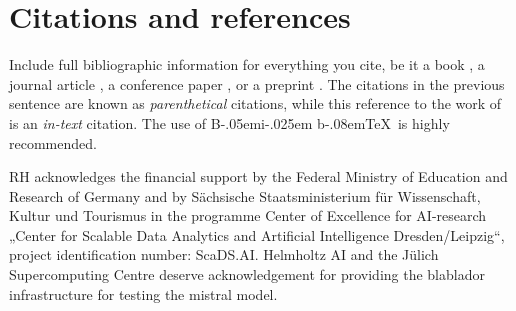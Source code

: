 \documentclass[doubleblind]{ecai}
\newcommand{\BibTeX}{B\kern-.05em{\sc i\kern-.025em b}\kern-.08em\TeX}
\begin{document}


\section{Citations and references}

Include full bibliographic information for everything you cite, 
be it a book \citep{pearl2009causality}, a journal article 
\citep{grosz1996collaborative,rumelhart1986learning,turing1950computing}, 
a conference paper \citep{kautz1992planning}, or a preprint 
\citep{perelman2002entropy}. The citations in the previous sentence are 
known as \emph{parenthetical} citations, while this reference to the 
work of \citet{turing1950computing} is an \emph{in-text} citation.
The use of \BibTeX\ is highly recommended. 



\begin{ack}
RH acknowledges the financial support by the Federal Ministry of Education and Research of Germany and by Sächsische Staatsministerium für Wissenschaft, Kultur und Tourismus in the programme Center of Excellence for AI-research „Center for Scalable Data Analytics and Artificial Intelligence Dresden/Leipzig“, project identification number: ScaDS.AI.
Helmholtz AI and the Jülich Supercomputing Centre deserve acknowledgement for providing the blablador infrastructure for testing the mistral model.
\end{ack}




\end{document}
